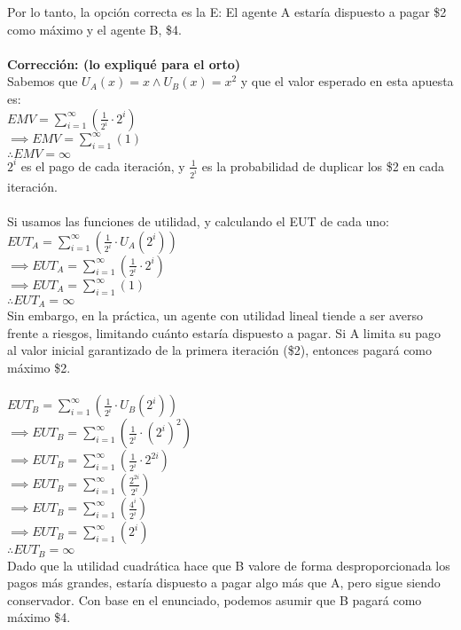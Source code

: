 \documentclass{article}
\begin{document}
        Por lo tanto, la opción correcta es la E: El agente A estaría dispuesto a pagar \$2 como máximo y el agente B, \$4.
        \\
        \\
        \textbf{Corrección: (lo expliqué para el orto)} \\
        Sabemos que \(U_{A}(x) = x \wedge U_{B}(x) = x^{2}\) y que el valor esperado en esta apuesta es: \\
        \(EMV = \sum^{\infty}_{i = 1}(\frac{1}{2^{i}} \cdot 2^{i})\) \\
        \(\implies EMV = \sum^{\infty}_{i = 1}(1)\) \\
        \(\therefore EMV = \infty\) \\
        $2^{i}$ es el pago de cada iteración, y $\frac{1}{2^{i}}$ es la probabilidad de duplicar los \$2 en cada iteración.
        \\
        \\
        Si usamos las funciones de utilidad, y calculando el EUT de cada uno: \\
        \(EUT_{A} = \sum^{\infty}_{i = 1}\left( \frac{1}{2^{i}} \cdot U_{A}(2^{i}) \right)\) \\
        \(\implies EUT_{A} = \sum^{\infty}_{i = 1}\left( \frac{1}{2^{i}} \cdot 2^{i} \right)\) \\
        \(\implies EUT_{A} = \sum^{\infty}_{i = 1}(1)\) \\
        \(\therefore EUT_{A} = \infty\) \\
        Sin embargo, en la práctica, un agente con utilidad lineal tiende a ser averso frente a riesgos, limitando cuánto estaría dispuesto a pagar. Si A limita su pago al valor inicial garantizado de la primera iteración (\$2), entonces pagará como máximo \$2. \\
        \\
        \(EUT_{B} = \sum^{\infty}_{i = 1}\left( \frac{1}{2^{i}} \cdot U_{B}(2^{i}) \right)\) \\
        \(\implies EUT_{B} = \sum^{\infty}_{i = 1}\left( \frac{1}{2^{i}} \cdot (2^{i})^{2} \right)\) \\
        \(\implies EUT_{B} = \sum^{\infty}_{i = 1}\left( \frac{1}{2^{i}} \cdot 2^{2i} \right)\) \\
        \(\implies EUT_{B} = \sum^{\infty}_{i = 1}(\frac{2^{2i}}{2^{i}})\) \\
        \(\implies EUT_{B} = \sum^{\infty}_{i = 1}(\frac{4^{i}}{2^{i}})\) \\
        \(\implies EUT_{B} = \sum^{\infty}_{i = 1}(2^{i})\) \\
        \(\therefore EUT_{B} = \infty\) \\
        Dado que la utilidad cuadrática hace que B valore de forma desproporcionada los pagos más grandes, estaría dispuesto a pagar algo más que A, pero sigue siendo conservador. Con base en el enunciado, podemos asumir que B pagará como máximo \$4.
\end{document}
